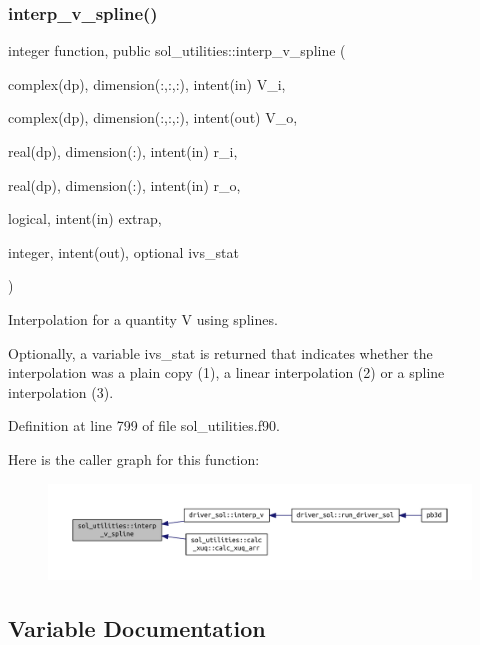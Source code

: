 \subsubsection{\texorpdfstring{interp\+\_\+v\+\_\+spline()}{interp\_v\_spline()}}
{\footnotesize\ttfamily integer function, public sol\+\_\+utilities\+::interp\+\_\+v\+\_\+spline (\begin{DoxyParamCaption}\item[{complex(dp), dimension(\+:,\+:,\+:), intent(in)}]{V\+\_\+i,  }\item[{complex(dp), dimension(\+:,\+:,\+:), intent(out)}]{V\+\_\+o,  }\item[{real(dp), dimension(\+:), intent(in)}]{r\+\_\+i,  }\item[{real(dp), dimension(\+:), intent(in)}]{r\+\_\+o,  }\item[{logical, intent(in)}]{extrap,  }\item[{integer, intent(out), optional}]{ivs\+\_\+stat }\end{DoxyParamCaption})}



Interpolation for a quantity V using splines. 

Optionally, a variable \textquotesingle{}ivs\+\_\+stat\textquotesingle{} is returned that indicates whether the interpolation was a plain copy (1), a linear interpolation (2) or a spline interpolation (3). 

Definition at line 799 of file sol\+\_\+utilities.\+f90.

Here is the caller graph for this function\+:
\nopagebreak
\begin{figure}[H]
\begin{center}
\leavevmode
\includegraphics[width=350pt]{namespacesol__utilities_a9af30f5bb948778dcafa7b80af6ea1fa_icgraph}
\end{center}
\end{figure}


\subsection{Variable Documentation}
\mbox{\label{namespacesol__utilities_a4779ff845b4ddc046892bf4eb4490dd2}} 
